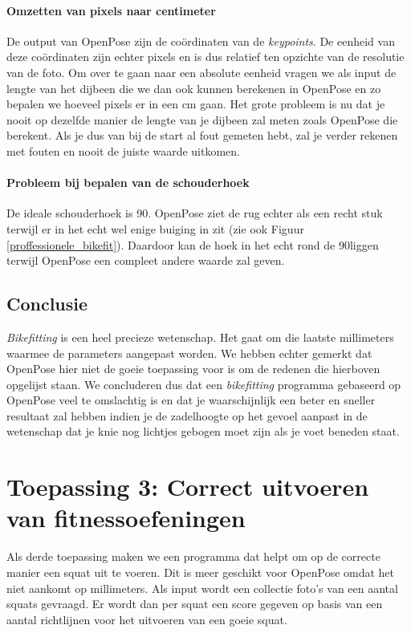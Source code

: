 \documentclass[a4paper,twoside,kulak]{kulakreport}
\begin{document}
\paragraph{Omzetten van pixels naar centimeter}
De output van OpenPose zijn de coördinaten van de \textit{keypoints}. De eenheid van deze coördinaten zijn echter pixels en is dus relatief ten opzichte van de resolutie van de foto. Om over te gaan naar een absolute eenheid vragen we als input de lengte van het dijbeen die we dan ook kunnen berekenen in OpenPose en zo bepalen we hoeveel pixels er in een \si{cm} gaan. Het grote probleem is nu dat je nooit op dezelfde manier de lengte van je dijbeen zal meten zoals OpenPose die berekent. Als je dus van bij de start al fout gemeten hebt, zal je verder rekenen met fouten en nooit de juiste waarde uitkomen.

\paragraph{Probleem bij bepalen van de schouderhoek}
De ideale schouderhoek is 90\degree. OpenPose ziet de rug echter als een recht stuk terwijl er in het echt wel enige buiging in zit (zie ook Figuur \ref{proffessionele_bikefit}). Daardoor kan de hoek in het echt rond de 90\degree liggen terwijl OpenPose een compleet andere waarde zal geven.

\subsection{Conclusie}
\textit{Bikefitting} is een heel precieze wetenschap. Het gaat om die laatste millimeters waarmee de parameters aangepast worden. We hebben echter gemerkt dat OpenPose hier niet de goeie toepassing voor is om de redenen die hierboven opgelijst staan. We concluderen dus dat een \textit{bikefitting} programma gebaseerd op OpenPose veel te omslachtig is en dat je waarschijnlijk een beter en sneller resultaat zal hebben indien je de zadelhoogte op het gevoel aanpast in de wetenschap dat je knie nog lichtjes gebogen moet zijn als je voet beneden staat.


\section{Toepassing 3: Correct uitvoeren van fitnessoefeningen}

Als derde toepassing maken we een programma dat helpt om op de correcte manier een squat uit te voeren. Dit is meer geschikt voor OpenPose omdat het niet aankomt op millimeters. Als input wordt een collectie foto's van een aantal squats gevraagd. Er wordt dan per squat een score gegeven op basis van een aantal richtlijnen voor het uitvoeren van een goeie squat.\cite{squats} 
\end{document}
